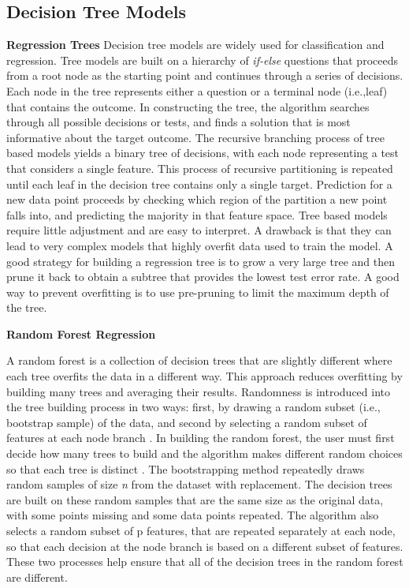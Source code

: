 \documentclass[sigconf]{acmart}
\begin{document}

\subsection{Decision Tree Models}

\textbf{Regression Trees}
Decision tree models are widely used for classification and regression. Tree 
models are built on a hierarchy of \textit{if-else} questions that proceeds 
from a root node as the starting point and continues through a series of 
decisions. Each node in the tree represents either a question or a terminal 
node (i.e.,leaf) that contains the outcome. In constructing the tree, the 
algorithm searches through all possible decisions or tests, and finds a 
solution that is most informative about the target outcome. The recursive 
branching process of tree based models yields a binary tree of decisions, 
with each node representing a test that considers a single feature. This 
process of recursive partitioning is repeated until each leaf in the decision 
tree contains only a single target. Prediction for a new data point proceeds 
by checking which region of the partition a new point falls into, and 
predicting the majority in that feature space. Tree based models require 
little adjustment and are easy to interpret. A drawback is that they can lead 
to very complex models that highly overfit data used to train the model. A 
good strategy for building a regression tree is to grow a very large tree 
and then prune it back to obtain a subtree that provides the lowest test error 
rate. A good way to prevent overfitting is to use pre-pruning to limit 
the maximum depth of the tree. 

\textbf{Random Forest Regression}

A random forest is a collection of decision trees that are slightly different 
where each tree overfits the data in a different way. This approach reduces 
overfitting by building many trees and averaging their results. Randomness is 
introduced into the tree building process in two ways: first, by drawing a 
random subset (i.e., bootstrap sample) of the data, and second by selecting 
a random subset of features at each node branch \cite{breiman01}. In building 
the random forest, the user must first decide how many trees to build and the 
algorithm makes different random choices so that each tree is distinct
\cite{muller17, raschka17}. The bootstrapping method repeatedly draws random 
samples of size \textit{n} from the dataset with replacement. The decision 
trees are built on these random samples that are the same size as the original 
data, with some points missing and some data points repeated. The algorithm 
also selects a random subset of p features, that are repeated separately at 
each node, so that each decision at the node branch is based on a different 
subset of features. These two processes help ensure that all of the decision 
trees in the random forest are different. 
\end{document}
